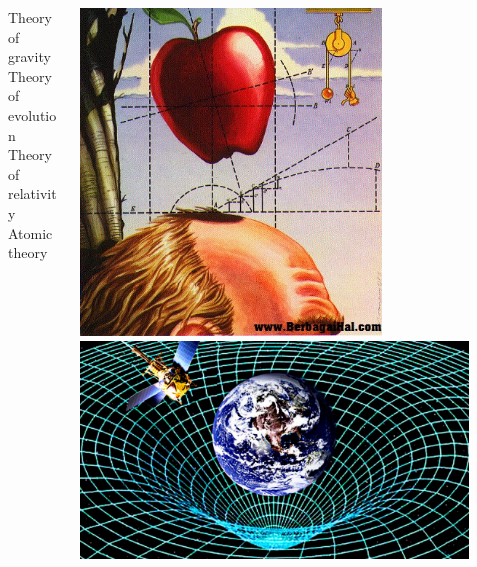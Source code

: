 \documentclass[10pt]{beamer}
\begin{document}
\begin{frame}[t]
\begin{columns}
		\begin{column}{0.33\textwidth}
			\begin{center}
				Theory of gravity\\
				\bigskip
				Theory of evolution\\
				\bigskip
				Theory of relativity\\
				\bigskip
				Atomic theory
			\end{center}
		\end{column}
		
		\begin{column}{0.33\textwidth}
			\begin{center}
				\includegraphics[width=0.7\textwidth]{figures/gravity2.jpg}\\
				\vspace{1.0cm}
				\includegraphics[width=0.9\textwidth]{figures/gravity.jpg}\\
			\end{center}
		\end{column}
	\end{columns}
\end{frame}
\end{document}
